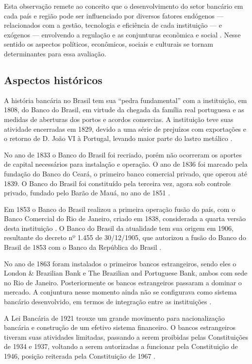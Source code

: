\documentclass[
  12pt,
  12pt,
  openright,
  oneside,
  a4paper,
  chapter=TITLE,
  section=TITLE,
  subsection=TITLE,
  subsubsection=TITLE,
  english,
  portugues,
  sumario=tradicional]{abntex2}
\begin{document}
Esta observação remete ao conceito que o desenvolvimento do setor bancário em cada país e região pode ser influenciado por diversos fatores endógenos --- relacionados com a gestão, tecnologia e eficiência de cada instituição --- e exógenos --- envolvendo a regulação e as conjunturas econômica e social \cite{rover:2011}. Nesse sentido os aspectos políticos, econômicos, sociais e culturais se tornam determinantes para essa avaliação.

\subsection{Aspectos históricos}

A história bancária no Brasil tem sua ``pedra fundamental'' com a instituição, em 1808, do Banco do Brasil, em virtude da chegada da família real portuguesa e as medidas de aberturas dos portos e acordos comercias. A instituição teve suas atividade encerradas em 1829, devido a uma série de prejuízos com exportações e o retorno de D. João VI à Portugal, levando maior parte do lastro metálico \cite{costaneto:2004, camargo:2009}.

No ano de 1833 o Banco do Brasil foi recriado, porém não ocorreram os aportes de capital necessários para instalação e operação. O ano de 1836 foi marcado pela fundação do Banco do Ceará, o primeiro banco comercial privado, que operou até 1839. O Banco do Brasil foi constituído pela terceira vez, agora sob controle privado, fundado pelo Barão de Mauá, no ano de 1851 \cite{costaneto:2004, camargo:2009}.

Em 1853 o Banco do Brasil realizou a primeira operação fusão do país, com o Banco Comercial do Rio de Janeiro, criado em 1838, considerada a quarta versão desta instituição \cite{camargo:2009}. O Banco do Brasil da atualidade tem sua origem em 1906, resultante do decreto nº 1.455 de 30/12/1905, que autorizou a fusão do Banco do Brasil de 1853 com o Banco da República do Brasil \cite{camargo:2009, Lei:1455:1905, costaneto:2004}.

No ano de 1863 foram instalados o primeiros bancos estrangeiros, sendo eles o London \& Brazilian Bank e The Brazilian and Portuguese Bank, ambos com sede no Rio de Janeiro. Posteriormente os bancos estrangeiros passaram a dominar o mercado. A conjuntura nesse momento ainda não se configurava como sistema bancário desenvolvido, em termos de integração entre as instituições \cite{camargo:2009, guimaraes:2011, mendes:2014}.

A Lei Bancária de 1921 trouxe um grande movimento para nacionalização bancária e construção de um efetivo sistema financeiro. O bancos estrangeiros tiveram suas atividades limitadas, passando a serem proibidas pelas Constituições de 1934 e 1937, voltando a serem autorizadas a funcionar pela Constituição de 1946, posição reiterada pela Constituição de 1967 \cite{camargo:2009, decreto:1921, guimaraes:2011}.
\end{document}
